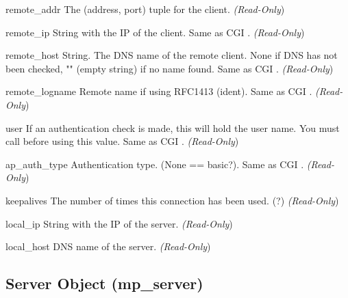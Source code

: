 \begin{memberdesc}[connection]{remote_addr}
The (address, port) tuple for the client.
\emph{(Read-Only})
\end{memberdesc}

\begin{memberdesc}[connection]{remote_ip}
String with the IP of the client. Same as CGI .
\emph{(Read-Only})
\end{memberdesc}

\begin{memberdesc}[connection]{remote_host}
String. The DNS name of the remote client. None if DNS has not been
checked, "" (empty string) if no name found. Same as CGI .
\emph{(Read-Only})
\end{memberdesc}

\begin{memberdesc}[connection]{remote_logname}
Remote name if using RFC1413 (ident). Same as CGI .
\emph{(Read-Only})
\end{memberdesc}

\begin{memberdesc}[connection]{user}
If an authentication check is made, this will hold the user
name.  You must call  before
using this value. Same as CGI .
\emph{(Read-Only})
\end{memberdesc}

\begin{memberdesc}[connection]{ap_auth_type}
Authentication type. (None == basic?). Same as CGI .
\emph{(Read-Only})
\end{memberdesc}

\begin{memberdesc}[connection]{keepalives}
The number of times this connection has been used. (?)
\emph{(Read-Only})
\end{memberdesc}

\begin{memberdesc}[connection]{local_ip}
String with the IP of the server.
\emph{(Read-Only})
\end{memberdesc}

\begin{memberdesc}[connection]{local_host}
DNS name of the server.
\emph{(Read-Only})
\end{memberdesc}

\subsection{Server Object (mp_server)\label{pyapi-mpserver}}


